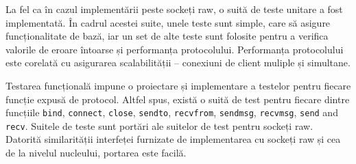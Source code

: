 La fel ca în cazul implementării peste sockeți raw, o suită de teste unitare a
fost implementată. În cadrul acestei suite, unele teste sunt simple, care să
asigure funcționalitate de bază, iar un set de alte teste sunt folosite pentru a
verifica valorile de eroare întoarse și performanța protocolului. Performanța
protocolului este corelată cu asigurarea scalabilității -- conexiuni de
client muliple și simultane.

Testarea funcțională impune o proiectare și implementare a testelor pentru
fiecare funcție expusă de protocol. Altfel spus, există o suită de test pentru
fiecare dintre funcțiile \texttt{bind}, \texttt{connect}, \texttt{close},
\texttt{sendto}, \texttt{recvfrom}, \texttt{sendmsg}, \texttt{recvmsg},
\texttt{send} and \texttt{recv}. Suitele de teste sunt portări ale suitelor
de test pentru sockeți raw. Datorită similarității interfeței furnizate de
implementarea cu sockeți raw și cea de la nivelul nucleului, portarea este
facilă.
